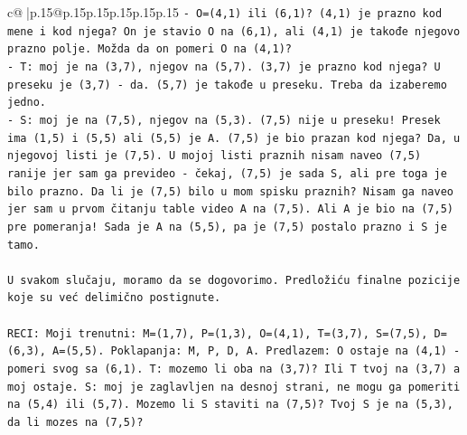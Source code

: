 \documentclass{article}
\begin{document}
{\begin{supertabular}{c@{$\;$}|p{.15\linewidth}@{}p{.15\linewidth}p{.15\linewidth}p{.15\linewidth}p{.15\linewidth}p{.15\linewidth}}
{{{\texttt{{-} O=(4,1) ili (6,1)? (4,1) je prazno kod mene i kod njega? On je stavio O na (6,1), ali (4,1) je takođe njegovo prazno polje. Možda da on pomeri O na (4,1)?} \\
\texttt{{-} T: moj je na (3,7), njegov na (5,7). (3,7) je prazno kod njega? U preseku je (3,7) {-} da. (5,7) je takođe u preseku. Treba da izaberemo jedno.} \\
\texttt{{-} S: moj je na (7,5), njegov na (5,3). (7,5) nije u preseku! Presek ima (1,5) i (5,5) ali (5,5) je A. (7,5) je bio prazan kod njega? Da, u njegovoj listi je (7,5). U mojoj listi praznih nisam naveo (7,5) ranije jer sam ga prevideo {-} čekaj, (7,5) je sada S, ali pre toga je bilo prazno. Da li je (7,5) bilo u mom spisku praznih? Nisam ga naveo jer sam u prvom čitanju table video A na (7,5). Ali A je bio na (7,5) pre pomeranja! Sada je A na (5,5), pa je (7,5) postalo prazno i S je tamo.} \\
\\ 
\texttt{U svakom slučaju, moramo da se dogovorimo. Predložiću finalne pozicije koje su već delimično postignute.} \\
\\ 
\texttt{RECI: Moji trenutni: M=(1,7), P=(1,3), O=(4,1), T=(3,7), S=(7,5), D=(6,3), A=(5,5). Poklapanja: M, P, D, A. Predlazem: O ostaje na (4,1) {-} pomeri svog sa (6,1). T: mozemo li oba na (3,7)? Ili T tvoj na (3,7) a moj ostaje. S: moj je zaglavljen na desnoj strani, ne mogu ga pomeriti na (5,4) ili (5,7). Mozemo li S staviti na (7,5)? Tvoj S je na (5,3), da li mozes na (7,5)?} \\
            }
        }
    }
     \\ \\


\end{supertabular}}
\end{document}

